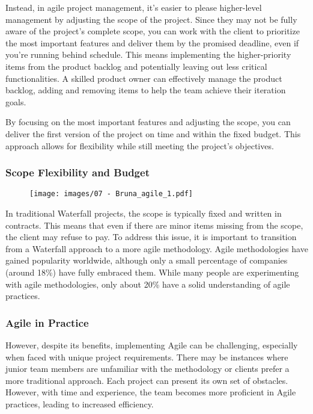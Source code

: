 Instead, in agile project management, it's easier to please higher-level
management by adjusting the scope of the project. Since they may not be
fully aware of the project's complete scope, you can work with the
client to prioritize the most important features and deliver them by the
promised deadline, even if you're running behind schedule. This means
implementing the higher-priority items from the product backlog and
potentially leaving out less critical functionalities. A skilled product
owner can effectively manage the product backlog, adding and removing
items to help the team achieve their iteration goals.

By focusing on the most important features and adjusting the scope, you
can deliver the first version of the project on time and within the
fixed budget. This approach allows for flexibility while still meeting
the project's objectives.

\subsubsection{Scope Flexibility and Budget}

\begin{figure}[!h]
  \centering
  \texttt{[image: images/07 - Bruna\_agile\_1.pdf]}
\end{figure}

In traditional Waterfall projects, the scope is typically fixed and
written in contracts. This means that even if there are minor items
missing from the scope, the client may refuse to pay. To address this
issue, it is important to transition from a Waterfall approach to a more
agile methodology. Agile methodologies have gained popularity worldwide,
although only a small percentage of companies (around 18\%) have fully
embraced them. While many people are experimenting with agile
methodologies, only about 20\% have a solid understanding of agile
practices.

\subsubsection{Agile in Practice}

However, despite its benefits, implementing Agile can be challenging,
especially when faced with unique project requirements. There may be
instances where junior team members are unfamiliar with the methodology
or clients prefer a more traditional approach. Each project can present
its own set of obstacles. However, with time and experience, the team
becomes more proficient in Agile practices, leading to increased
efficiency.

